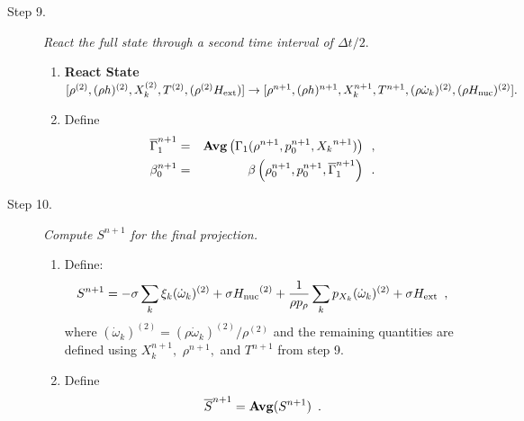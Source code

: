 \documentclass[11pt]{article}
\newcommand{\gammabar}{\overline{\Gamma}_1}
\newcommand{\Hext}{{H_{\rm ext}}}
\newcommand{\Hnuc}{{H_{\rm nuc}}}
\newcommand{\dt}{\Delta t}
\newcommand{\omegadot}{\dot{\omega}}
\begin{document}
\begin{description}
\begin{enumerate}
\end{enumerate}

\item[Step 9.] {\em React the full state through a second time interval of $\dt / 2.$}

\begin{enumerate}
\renewcommand{\theenumi}{{\bf \alph{enumi}}}

\item {\bf React State}$[\rho^{(2)},(\rho h)^{(2)}, X_k^{(2)},T^{(2)}, (\rho^{(2)} \Hext) ]
                   \rightarrow [\rho^{n+1}, (\rho h)^{n+1}, X_k^{n+1}, T^{n+1}, 
                               (\rho \omegadot_k)^{(2)}, (\rho \Hnuc)^{(2)} ].$  

\item Define
\begin{eqnarray}
 \gammabar^{n+1}    &=& {\rm{\bf Avg}}\left(\Gamma_1(\rho^{n+1}, p_0^{n+1}, {X_k}^{n+1}) \right) \enskip , \nonumber \\ 
 {\beta   }_0^{n+1}    &=& \beta   \left(\rho_0^{n+1}, p_0^{n+1},   \gammabar^{n+1}\right) \enskip .
\end{eqnarray}

\end{enumerate}

\item[Step 10.] {\em Compute $S^{n+1}$ for the final projection.}

\begin{enumerate}
\renewcommand{\theenumi}{{\bf \alph{enumi}}}
\item Define:
\begin{equation}
  S^{n+1} =  -\sigma  \sum_k  \xi_k (\omegadot_k)^{(2)}  + \sigma \Hnuc^{(2)} +
  \frac{1}{\rho p_\rho} \sum_k p_{X_k}  ({\omegadot}_k)^{(2)}  
   + \sigma \Hext \enskip ,
\end{equation}
where $(\omegadot_k)^{(2)} = (\rho \omegadot_k)^{(2)} / \rho^{(2)}$
and the remaining quantities are defined using $X_k^{n+1},$ $\rho^{n+1},$
and $T^{n+1}$ from step 9.

\item Define
\[
\overline{S}^{n+1} = {\mathrm{\bf Avg}} (S^{n+1}) \enskip.
\]

\end{enumerate}



\end{description}
\end{document}
